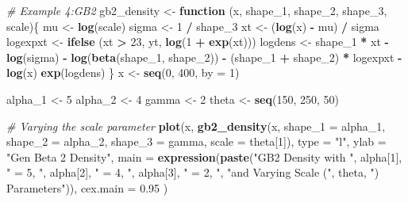 \documentclass[]{book}
\newenvironment{Shaded}{\begin{snugshade}}{\end{snugshade}}
\newcommand{\KeywordTok}[1]{\textcolor[rgb]{0.13,0.29,0.53}{\textbf{#1}}}
\newcommand{\DataTypeTok}[1]{\textcolor[rgb]{0.13,0.29,0.53}{#1}}
\newcommand{\DecValTok}[1]{\textcolor[rgb]{0.00,0.00,0.81}{#1}}
\newcommand{\FloatTok}[1]{\textcolor[rgb]{0.00,0.00,0.81}{#1}}
\newcommand{\StringTok}[1]{\textcolor[rgb]{0.31,0.60,0.02}{#1}}
\newcommand{\CommentTok}[1]{\textcolor[rgb]{0.56,0.35,0.01}{\textit{#1}}}
\newcommand{\ControlFlowTok}[1]{\textcolor[rgb]{0.13,0.29,0.53}{\textbf{#1}}}
\newcommand{\OperatorTok}[1]{\textcolor[rgb]{0.81,0.36,0.00}{\textbf{#1}}}
\newcommand{\NormalTok}[1]{#1}
\theoremstyle{definition}
\theoremstyle{definition}
\theoremstyle{definition}
\theoremstyle{remark}
\begin{document}
\begin{Shaded}
\begin{Highlighting}[]
\CommentTok{# Example 4:GB2}
\NormalTok{gb2_density <-}\StringTok{ }\ControlFlowTok{function}\NormalTok{ (x, shape_}\DecValTok{1}\NormalTok{, shape_}\DecValTok{2}\NormalTok{, shape_}\DecValTok{3}\NormalTok{, scale)\{}
\NormalTok{  mu <-}\StringTok{ }\KeywordTok{log}\NormalTok{(scale)}
\NormalTok{  sigma <-}\StringTok{ }\DecValTok{1} \OperatorTok{/}\StringTok{ }\NormalTok{shape_}\DecValTok{3}
\NormalTok{  xt <-}\StringTok{ }\NormalTok{(}\KeywordTok{log}\NormalTok{(x) }\OperatorTok{-}\StringTok{ }\NormalTok{mu) }\OperatorTok{/}\StringTok{ }\NormalTok{sigma}
\NormalTok{  logexpxt <-}\StringTok{ }\KeywordTok{ifelse}\NormalTok{ (xt }\OperatorTok{>}\StringTok{ }\DecValTok{23}\NormalTok{, yt, }\KeywordTok{log}\NormalTok{(}\DecValTok{1} \OperatorTok{+}\StringTok{ }\KeywordTok{exp}\NormalTok{(xt)))}
\NormalTok{  logdens <-}\StringTok{ }\NormalTok{shape_}\DecValTok{1} \OperatorTok{*}\StringTok{ }\NormalTok{xt }\OperatorTok{-}\StringTok{ }\KeywordTok{log}\NormalTok{(sigma) }\OperatorTok{-}\StringTok{ }\KeywordTok{log}\NormalTok{(}\KeywordTok{beta}\NormalTok{(shape_}\DecValTok{1}\NormalTok{, shape_}\DecValTok{2}\NormalTok{)) }\OperatorTok{-}\StringTok{ }
\StringTok{    }\NormalTok{(shape_}\DecValTok{1} \OperatorTok{+}\StringTok{ }\NormalTok{shape_}\DecValTok{2}\NormalTok{) }\OperatorTok{*}\StringTok{ }\NormalTok{logexpxt }\OperatorTok{-}\StringTok{ }\KeywordTok{log}\NormalTok{(x) }
  \KeywordTok{exp}\NormalTok{(logdens)}
\NormalTok{\}}
\NormalTok{x <-}\StringTok{ }\KeywordTok{seq}\NormalTok{(}\DecValTok{0}\NormalTok{, }\DecValTok{400}\NormalTok{, }\DataTypeTok{by =} \DecValTok{1}\NormalTok{)}

\NormalTok{alpha_}\DecValTok{1}\NormalTok{ <-}\StringTok{ }\DecValTok{5}
\NormalTok{alpha_}\DecValTok{2}\NormalTok{ <-}\StringTok{ }\DecValTok{4} 
\NormalTok{gamma <-}\StringTok{ }\DecValTok{2}
\NormalTok{theta <-}\StringTok{ }\KeywordTok{seq}\NormalTok{(}\DecValTok{150}\NormalTok{, }\DecValTok{250}\NormalTok{, }\DecValTok{50}\NormalTok{)}

\CommentTok{# Varying the scale parameter}
\KeywordTok{plot}\NormalTok{(x, }
     \KeywordTok{gb2_density}\NormalTok{(x, }\DataTypeTok{shape_1 =}\NormalTok{ alpha_}\DecValTok{1}\NormalTok{, }\DataTypeTok{shape_2 =}\NormalTok{ alpha_}\DecValTok{2}\NormalTok{, }\DataTypeTok{shape_3 =}\NormalTok{ gamma, }
                 \DataTypeTok{scale =}\NormalTok{ theta[}\DecValTok{1}\NormalTok{]), }\DataTypeTok{type =} \StringTok{"l"}\NormalTok{, }\DataTypeTok{ylab =} \StringTok{"Gen Beta 2 Density"}\NormalTok{, }
     \DataTypeTok{main =} \KeywordTok{expression}\NormalTok{(}\KeywordTok{paste}\NormalTok{(}\StringTok{"GB2 Density with "}\NormalTok{, alpha[}\DecValTok{1}\NormalTok{], }\StringTok{" = 5, "}\NormalTok{, }
\NormalTok{                             alpha[}\DecValTok{2}\NormalTok{], }\StringTok{" = 4, "}\NormalTok{, alpha[}\DecValTok{3}\NormalTok{], }\StringTok{" = 2, "}\NormalTok{, }
                             \StringTok{"and Varying Scale ("}\NormalTok{, theta, }\StringTok{") Parameters"}\NormalTok{)), }
     \DataTypeTok{cex.main =} \FloatTok{0.95}\NormalTok{ )}


\end{Highlighting}
\end{Shaded}
\end{document}
